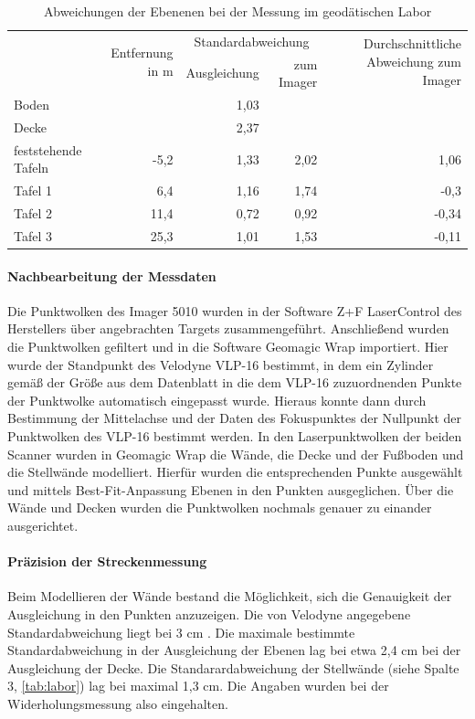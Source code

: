 \documentclass[a4paper,12pt,bibliography=totoc, listof=totoc,titlepage,pointlessnumbers]{scrreprt}
\begin{document}
\begin{table}
\centering
\begin{tabular}{|l|r|r|r|r|}
\cline{2-4}
\hline
\multirow{ 2}{*}{}	& \multirow{ 2}{*}{Entfernung in m} &	\multicolumn{2}{c|}{Standardabweichung}	&  \multirow{ 2}{*}{Durchschnittliche Abweichung zum Imager}\\
			& 		& Ausgleichung	& zum Imager & \\ \hline
Boden			&		& 1,03	&	& 	\\ \hline
Decke			& 	    	& 2,37	&	& 	\\ \hline
feststehende Tafeln	& -5,2		& 1,33	& 2,02	& 1,06	\\ \hline
Tafel 1			& 6,4      	& 1,16	& 1,74	& -0,3	\\ \hline
Tafel 2			& 11,4     	& 0,72	& 0,92	& -0,34	\\ \hline
Tafel 3			& 25,3     	& 1,01	& 1,53	& -0,11	\\ \hline
\end{tabular}
\caption{Abweichungen der Ebenenen bei der Messung im geodätischen Labor}
\label{tab:labor}
\end{table}

\paragraph{Nachbearbeitung der Messdaten}
Die Punktwolken des Imager 5010 wurden in der Software Z+F LaserControl des Herstellers über angebrachten Targets zusammengeführt. Anschließend wurden die Punktwolken gefiltert und in die Software Geomagic Wrap importiert. Hier wurde der Standpunkt des Velodyne VLP-16 bestimmt, in dem ein Zylinder gemäß der Größe aus dem Datenblatt \citep{vlpSheet} in die dem VLP-16 zuzuordnenden Punkte der Punktwolke automatisch eingepasst wurde.  Hieraus konnte dann durch Bestimmung der Mittelachse und der Daten des Fokuspunktes der Nullpunkt der Punktwolken des VLP-16 bestimmt werden.
In den Laserpunktwolken der beiden Scanner wurden in Geomagic Wrap die Wände, die Decke und der Fußboden und die Stellwände modelliert. Hierfür wurden die entsprechenden Punkte ausgewählt und mittels Best-Fit-Anpassung Ebenen in den Punkten ausgeglichen. Über die Wände und Decken wurden die Punktwolken nochmals genauer zu einander ausgerichtet.

\paragraph{Präzision der Streckenmessung}
Beim Modellieren der Wände bestand die Möglichkeit, sich die Genauigkeit der Ausgleichung in den Punkten anzuzeigen. Die von Velodyne angegebene Standardabweichung liegt bei 3 cm \citep{vlpSheet}. Die maximale bestimmte Standardabweichung in der Ausgleichung der Ebenen lag bei etwa 2,4 cm bei der Ausgleichung der Decke. Die Standarardabweichung der Stellwände (siehe Spalte 3, \autoref{tab:labor}) lag bei maximal 1,3 cm. Die Angaben wurden bei der Widerholungsmessung also eingehalten.
\end{document}
